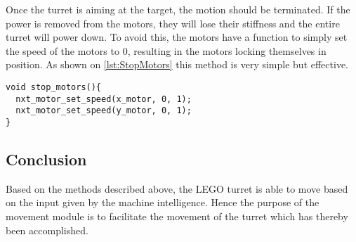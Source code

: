 Once the turret is aiming at the target, the motion should be terminated.
If the power is removed from the motors, they will lose their stiffness and the entire turret will power down.
To avoid this, the motors have a function to simply set the speed of the motors to $0$, resulting in the motors locking themselves in position.
As shown on \autoref{lst:StopMotors} this method is very simple but effective.
\begin{lstlisting}[language=CSharp,label={lst:StopMotors},caption={stop\_motors method from movement.c}]
void stop_motors(){
  nxt_motor_set_speed(x_motor, 0, 1);
  nxt_motor_set_speed(y_motor, 0, 1);
}
\end{lstlisting}

\subsection{Conclusion}
Based on the methods described above, the LEGO turret is able to move based on the input given by the machine intelligence.
Hence the purpose of the movement module is to facilitate the movement of the turret which has thereby been accomplished.
